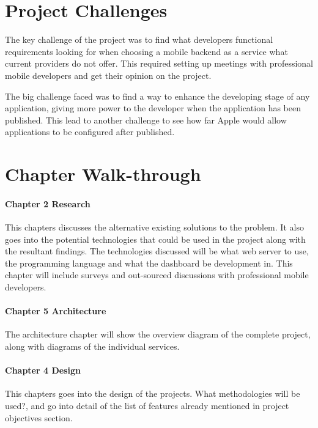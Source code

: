 \section{Project Challenges}

The key challenge of the project was to find what developers functional requirements looking for when choosing a mobile backend as a service what current providers do not offer. This required setting up meetings with professional mobile developers and get their opinion on the project.

The big challenge faced was to find a way to enhance the developing stage of any application, giving more power to the developer when the application has been published. This lead to another challenge to see how far Apple would allow applications to be configured after published.

\section{Chapter Walk-through}

\paragraph{Chapter 2 Research}

This chapters discusses the alternative existing solutions to the problem. It also goes into the potential technologies that could be used in the project along with the resultant findings. The technologies discussed will be what web server to use, the programming language and what the dashboard be development in. This chapter will include surveys and out-sourced discussions with professional mobile developers.

\paragraph{Chapter 5 Architecture}

The architecture chapter will show the overview diagram of the complete project, along with diagrams of the individual services.

\paragraph{Chapter 4 Design}

This chapters goes into the design of the projects. What methodologies will be used?, and go into detail of the list of features already mentioned in project objectives section.

